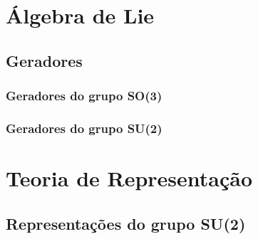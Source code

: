 \documentclass{article}
\numberwithin{equation}{section}
\numberwithin{figure}{section}
\begin{document}
\section{Álgebra de Lie}
\subsection{Geradores}
\subsubsection{Geradores do grupo SO(3)}
\subsubsection{Geradores do grupo SU(2)}
\section{Teoria de Representação}
\subsection{Representações do grupo SU(2)}


\pagebreak
\nocite{*}


\end{document}
